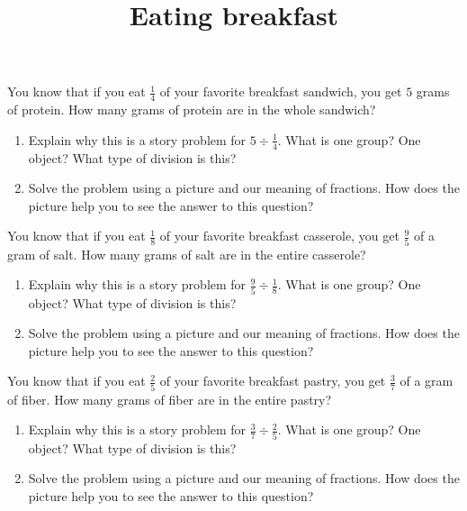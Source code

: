 \documentclass[nooutcomes,noauthor, handout]{ximera}
\title{Eating breakfast}
\begin{document}
\begin{abstract}
\end{abstract}

\maketitle

\begin{problem}
You know that if you eat $\frac{1}{4}$ of your favorite breakfast sandwich, you get $5$ grams of protein. How many grams of protein are in the whole sandwich?

\begin{enumerate}
	\item Explain why this is a story problem for $5 \div \frac{1}{4}$. What is one group? One object? What type of division is this?
	\item Solve the problem using a picture and our meaning of fractions. How does the picture help you to see the answer to this question?
\end{enumerate}


\end{problem}



\begin{problem}
You know that if you eat $\frac{1}{8}$ of your favorite breakfast casserole, you get $\frac{9}{5}$ of a gram of salt. How many grams of salt are in the entire casserole? 

\begin{enumerate}
	\item Explain why this is a story problem for $\frac{9}{5} \div \frac{1}{8}$. What is one group? One object? What type of division is this?
	\item Solve the problem using a picture and our meaning of fractions. How does the picture help you to see the answer to this question?
\end{enumerate}
\end{problem}



\begin{problem}
You know that if you eat $\frac{2}{5}$ of your favorite breakfast pastry, you get $\frac{3}{7}$ of a gram of fiber. How many grams of fiber are in the entire pastry?

\begin{enumerate}
	\item Explain why this is a story problem for $\frac{3}{7} \div \frac{2}{5}$. What is one group? One object? What type of division is this?
	\item Solve the problem using a picture and our meaning of fractions. How does the picture help you to see the answer to this question?
\end{enumerate}
\end{problem}
\end{document}
